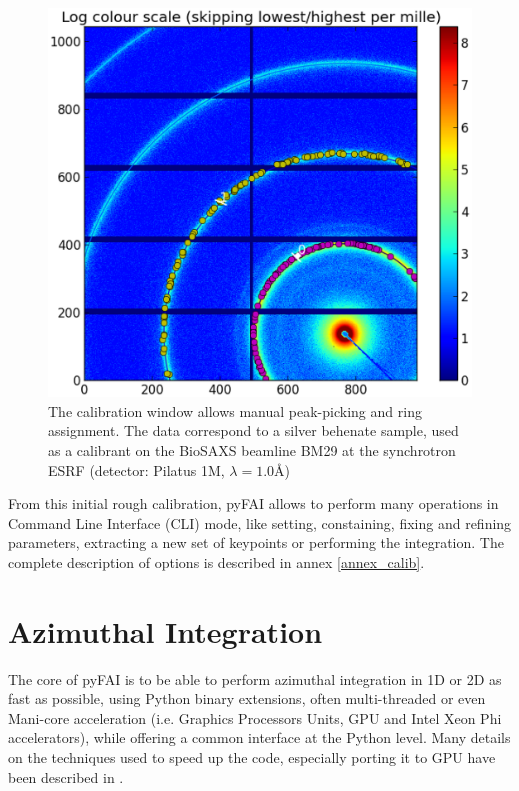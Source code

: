 \documentclass[preprint]{iucr}
\begin{document}
\begin{figure}
\label{calib}
\begin{center}
\includegraphics[width=15cm]{calib.eps}
\caption{The calibration window allows manual peak-picking and
ring assignment. The data correspond to a silver behenate sample, used as a
calibrant on the BioSAXS beamline BM29 at the synchrotron ESRF
(detector: Pilatus 1M, $\lambda=1.0${\AA})}
\end{center}
\end{figure}

From this initial rough calibration, pyFAI allows to perform many operations in
Command Line Interface (CLI) mode, like setting, constaining, fixing and
refining parameters, extracting a new set of keypoints or performing the
integration. The complete description of options is described in annex
\ref{annex_calib}.

\section{Azimuthal Integration}

The core of pyFAI is to be able to perform azimuthal integration in 1D or 2D as
fast as possible, using Python binary extensions, often multi-threaded or even
Mani-core acceleration (i.e. Graphics Processors Units, GPU and Intel Xeon
Phi accelerators), while offering a common interface at the Python level.
Many details on the techniques used to speed up the code, especially porting
it to GPU have been described in \cite{kieffer_ashiotis-proc-euroscipy-2014}.
\end{document}
